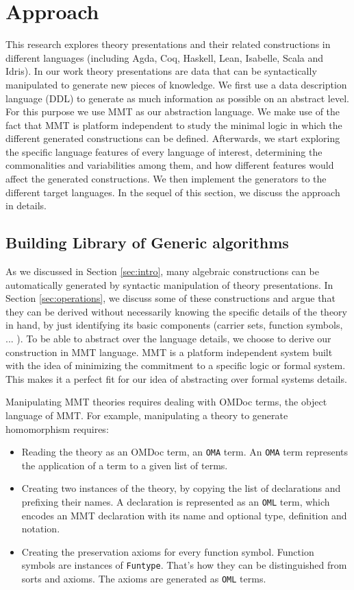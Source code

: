 \section{Approach}
\label{sec:approach}

This research explores theory presentations and their related constructions in different languages 
(including Agda, Coq, Haskell, Lean, Isabelle, Scala and Idris). In our work theory presentations are 
data 
that can be syntactically manipulated to generate new pieces of knowledge. We first use a data 
description language (DDL) to generate as much information as possible on an abstract level. For 
this 
purpose we use MMT as our abstraction language. We make use of the fact that MMT is platform 
independent to study the minimal logic in which the different generated constructions can be 
defined. 
Afterwards, we start exploring the specific language features of every language of interest, 
determining 
the commonalities and variabilities among them, and how different features would affect the 
generated 
constructions. We then implement the generators to the different target languages. In the sequel 
of 
this section, we discuss the approach in details. 

\subsection{Building Library of Generic algorithms}
\label{sec:library}
As we discussed in Section \ref{sec:intro}, many algebraic constructions can be automatically 
generated by syntactic manipulation of theory presentations. In Section \ref{sec:operations}, we 
discuss some of these constructions and argue that they can be derived without necessarily knowing 
the specific details of the theory in hand, by just identifying its basic components (carrier sets, 
function symbols, ... ). 
To be able to abstract over the language details, we choose to derive our construction in MMT 
language. MMT is a platform independent system built with the idea of minimizing the commitment to a 
specific logic or formal system. This makes it a perfect fit for our idea of abstracting over formal 
systems details. 

Manipulating MMT theories requires dealing with OMDoc terms, the object language of MMT. For 
example, manipulating a theory to generate homomorphism requires:
\begin{itemize}
\item Reading the theory as an OMDoc term, an \verb|OMA| term. An \verb|OMA| term represents the 
application of a term to a given list of terms. 
\item Creating two instances of the theory, by copying the list of declarations and prefixing their 
names. A declaration is represented as an \verb|OML| term, which encodes an MMT declaration with its 
name and optional type, definition and notation. 
\item Creating the preservation axioms for every function symbol. Function symbols are instances of 
\verb|Funtype|. That's how they can be distinguished from sorts and axioms. The axioms are generated 
as \verb|OML| terms. 
\end{itemize}

